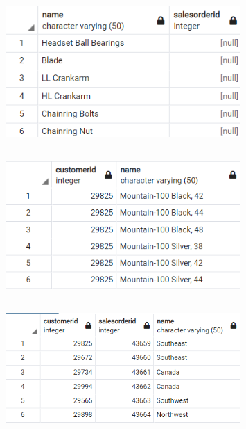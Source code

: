 \documentclass{article}
\begin{document}
\subsection{}
\begin{figure}[H]
    \centering
    \includegraphics[width=0.8\textwidth]{figures/5-b.png}
    \caption
	{
	}
    \label{fig:fig1}
\end{figure}

\subsection{}
\begin{figure}[H]
    \centering
    \includegraphics[width=0.8\textwidth]{figures/5-c.png}
    \caption
	{
	}
    \label{fig:fig1}
\end{figure}

\subsection{}
\begin{figure}[H]
    \centering
    \includegraphics[width=0.8\textwidth]{figures/5-d.png}
    \caption
	{
	}
    \label{fig:fig1}
\end{figure}
\end{document}

